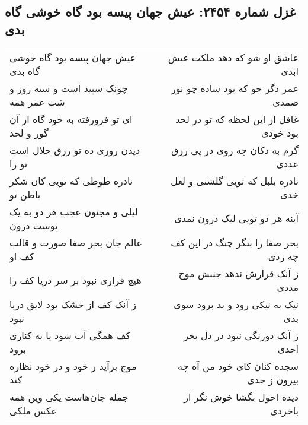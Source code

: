 \begin{center}
\section*{غزل شماره ۲۴۵۴: عیش جهان پیسه بود گاه خوشی گاه بدی}
\label{sec:2454}
\begin{longtable}{l p{0.5cm} r}
عیش جهان پیسه بود گاه خوشی گاه بدی
&&
عاشق او شو که دهد ملکت عیش ابدی
\\
چونک سپید است و سیه روز و شب عمر همه
&&
عمر دگر جو که بود ساده چو نور صمدی
\\
ای تو فرورفته به خود گاه از آن گور و لحد
&&
غافل از این لحظه که تو در لحد بود خودی
\\
دیدن روزی ده تو رزق حلال است تو را
&&
گرم به دکان چه روی در پی رزق عددی
\\
نادره طوطی که تویی کان شکر باطن تو
&&
نادره بلبل که تویی گلشنی و لعل خدی
\\
لیلی و مجنون عجب هر دو به یک پوست درون
&&
آینه هر دو تویی لیک درون نمدی
\\
عالم جان بحر صفا صورت و قالب کف او
&&
بحر صفا را بنگر چنگ در این کف چه زدی
\\
هیچ قراری نبود بر سر دریا کف را
&&
ز آنک قرارش ندهد جنبش موج مددی
\\
ز آنک کف از خشک بود لایق دریا نبود
&&
نیک به نیکی رود و بد برود سوی بدی
\\
کف همگی آب شود یا به کناری برود
&&
ز آنک دورنگی نبود در دل بحر احدی
\\
موج برآید ز خود و در خود نظاره کند
&&
سجده کنان کای خود من آه چه بیرون ز حدی
\\
جمله جان‌هاست یکی وین همه عکس ملکی
&&
دیده احول بگشا خوش نگر ار باخردی
\\
\end{longtable}
\end{center}
